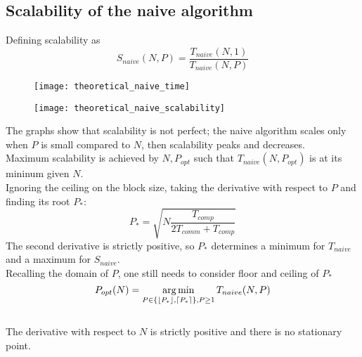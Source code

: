 \documentclass[a4paper, 11pt]{article}
\DeclareMathOperator*{\argmin}{arg\,min}
\DeclarePairedDelimiter{\ceil}{\lceil}{\rceil}
\DeclarePairedDelimiter{\floor}{\lfloor}{\rfloor}
\begin{document}
\subsection{Scalability of the naive algorithm}
Defining scalability as
$$S_{naive}(N, P) = \frac{T_{naive}(N, 1)}{T_{naive}(N, P)}$$
\FloatBarrier
\begin{figure}[h]
\centering
\begin{minipage}{.5\textwidth}
  \centering
  \texttt{[image: theoretical\_naive\_time]}
  \label{fig:theoretical_naive_time}
\end{minipage}%
\begin{minipage}{.5\textwidth}
  \centering
  \texttt{[image: theoretical\_naive\_scalability]}
  \label{fig:theoretical_naive_scalability}
\end{minipage}
\end{figure}
\FloatBarrier
The graphs show that scalability is not perfect; the naive algorithm scales only when $P$ is small compared to $N$, then scalability peaks and decreases.\\
Maximum scalability is achieved by $N, P_{opt}$ such that $T_{naive}(N, P_{opt})$ is at its mininum given $N$.\\
Ignoring the ceiling on the block size, taking the derivative with respect to $P$ and finding its root $P_{*}$:
$$P_{*} = \sqrt{N\frac{T_{comp}}{2T_{comm} + T_{comp}}}$$
The second derivative is strictly positive, so $P_{*}$ determines a minimum for $T_{naive}$ and a maximum for $S_{naive}$.\\
Recalling the domain of $P$, one still needs to consider floor and ceiling of $P_{*}$
$$P_{opt}(N) = \argmin_{P \in \{ \floor{P_{*}}, \ceil{P_{*}} \}, P \geq 1 }{T_{naive}(N, P)} $$\\
The derivative with respect to $N$ is strictly positive and there is no stationary point.\\
\end{document}
